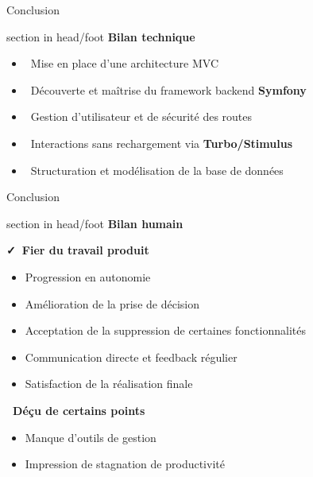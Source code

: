 \documentclass{beamer}
\begin{document}
\begin{frame}{Conclusion}
  	\begin{beamercolorbox}[wd=\paperwidth,ht=1.5em,dp=0.5em,leftskip=0.5cm]{section in head/foot}
  		\large \textbf{Bilan technique}
	\end{beamercolorbox}
	\vspace{0.5em}
	\begin{center}
  		\begin{minipage}{0.9\textwidth}
  			\begin{itemize}
  				\item \faLaptopCode\ Mise en place d'une architecture MVC
  				\item \faCodeBranch\ Découverte et maîtrise du framework backend \textbf{Symfony}
  				\item \faLock\ Gestion d'utilisateur et de sécurité des routes
  				\item \faBolt\ Interactions sans rechargement via \textbf{Turbo/Stimulus}
  				\item \faDatabase\ Structuration et modélisation de la base de données
			\end{itemize}
  		\end{minipage}
	\end{center}
	\vfill
\end{frame}

\begin{frame}{Conclusion}
  	\begin{beamercolorbox}[wd=\paperwidth,ht=1.5em,dp=0.5em,leftskip=0.5cm]{section in head/foot}
  		\large \textbf{Bilan humain}
	\end{beamercolorbox}
	\vspace{0.5em}
	\begin{center}
  		\begin{minipage}{1\textwidth}
  			\textbf{\faCheck\ Fier du travail produit}
  			\begin{itemize}
  				\item Progression en autonomie
  				\item Amélioration de la prise de décision
  				\item Acceptation de la suppression de certaines fonctionnalités
  				\item Communication directe et feedback régulier
  				\item Satisfaction de la réalisation finale
  			\end{itemize}
  				
  			\pause

  			\textbf{\faTimes\ Déçu de certains points}
  			\begin{itemize}
  				\item Manque d'outils de gestion
		  		\item Impression de stagnation de productivité
  			\end{itemize}
  		\end{minipage}
	\end{center}
	\vfill
\end{frame}
\end{document}
